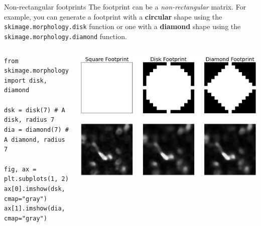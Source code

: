 \documentclass[9pt, aspectratio=169]{beamer}
\begin{document}
\begin{frame}
    {Non-rectangular footprints}
    The footprint can be a \textit{non-rectangular} matrix. For example, you can generate a footprint with a \textbf{circular} shape using the \texttt{skimage.morphology.disk} function or one with a \textbf{diamond} shape using the \texttt{skimage.morphology.diamond} function.\\

    \vspace{2em}

    \begin{columns}
        \begin{column}{.5\textwidth}
            \begin{codebox}
                \texttt{from skimage.morphology import disk, diamond\\
                    \\
                    dsk = disk(7) \# A disk, radius 7\\
                    dia = diamond(7) \# A diamond, radius 7\\
                    \\
                    fig, ax = plt.subplots(1, 2)\\
                    ax[0].imshow(dsk, cmap="gray")\\
                    ax[1].imshow(dia, cmap="gray")
                }
            \end{codebox}
        \end{column}
        \begin{column}{.5\textwidth}
            \centering
            \includegraphics[width=\textwidth]{different_shaped_footprints.png}
        \end{column}
    \end{columns}
\end{frame}
\end{document}
